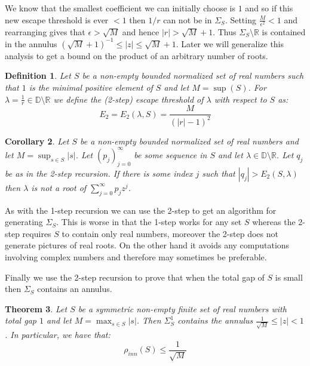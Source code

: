 \documentclass[11pt]{amsart}
\newtheorem{theorem}{Theorem}
\newtheorem{corollary}[theorem]{Corollary}
\newtheorem{definition}[theorem]{Definition}
\numberwithin{theorem}{section} %
\numberwithin{corollary}{section}
\numberwithin{lemma}{section}
\numberwithin{proposition}{section}
\numberwithin{definition}{section}
\begin{document}
We know that the smallest coefficient we can initially choose is $1$ and so if this new escape threshold is ever $< 1$ then $1/r$ can not be in $\Sigma_S$. Setting $\frac{M}{\epsilon^2} < 1$ and rearranging gives that $\epsilon > \sqrt{M}$ and hence $|r| > \sqrt{M}+1$. Thus $\Sigma_S \setminus \mathbb{R}$ is contained in the annulus $(\sqrt{M}+1)^{-1} \leqslant |z| \leqslant \sqrt{M}+1$. Later we will generalize this analysis to get a bound on the product of an arbitrary number of roots.

\begin{definition}
Let $S$ be a non-empty bounded normalized set of real numbers such that $1$ is the minimal positive element of $S$ and let $M = \sup(S)$. For $\lambda = \frac{1}{r} \in \mathbb{D} \setminus \mathbb{R}$ we define the (2-step) escape threshold of $\lambda$ with respect to $S$ as:
\begin{equation*}
E_2 = E_2(\lambda, S) = \frac{M}{(|r| - 1)^2}
\end{equation*}
\end{definition}

\begin{corollary}
Let $S$ be a non-empty bounded normalized set of real numbers and let $M = \sup_{s \in S}|s|$. Let $(p_j)_{j=0}^\infty$ be some sequence in $S$ and let $\lambda \in \mathbb{D} \setminus \mathbb{R}$. Let $q_j$ be as in the 2-step recursion. If there is some index $j$ such that $|q_j| > E_2(S, \lambda)$ then $\lambda$ is not a root of $\sum_{j=0}^\infty p_jz^j$.
\end{corollary}




As with the 1-step recursion we can use the 2-step to get an algorithm for generating $\Sigma_S$. This is worse in that the 1-step works for any set $S$ whereas the 2-step requires $S$ to contain only real numbers, moreover the 2-step does not generate pictures of real roots. On the other hand it avoids any computations involving complex numbers and therefore may sometimes be preferable.









Finally we use the 2-step recursion to prove that when the total gap of $S$ is small then $\Sigma_S$ contains an annulus.

\begin{theorem}
\label{annulus}
Let $S$ be a symmetric non-empty finite set of real numbers with total gap $1$ and let $M = \max_{s \in S} |s|$. Then $\Sigma^1_S$ contains the annulus $\frac{1}{\sqrt{M}} \leqslant |z| < 1$. In particular, we have that:
$$\rho_{inn}(S) \leqslant \frac{1}{\sqrt{M}} $$
\end{theorem}
\end{document}
